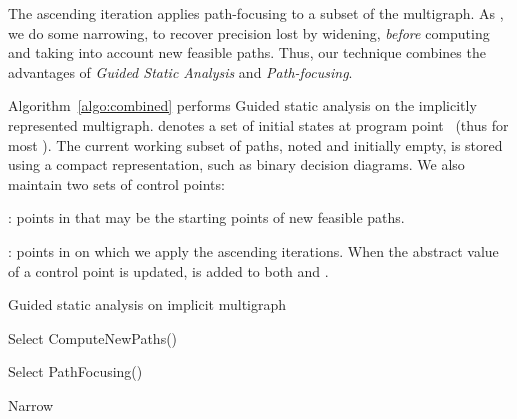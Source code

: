 The ascending iteration applies path-focusing
\cite{Monniaux_Gonnord_SAS11} to a subset of the multigraph. As
\cite{DBLP:conf/sas/GopanR07}, we do some narrowing, to recover
precision lost by widening, \emph{before}
computing and taking into account new feasible paths. Thus, our
technique combines the advantages of \emph{Guided Static
  Analysis} and \emph{Path-focusing}.




Algorithm~\ref{algo:combined} performs Guided static analysis on the implicitly represented multigraph.
 denotes a set of initial states at program point~ (thus  for most ).
The current working subset of paths, noted  and initially empty, is
stored using a compact representation, such as binary decision
diagrams. We also maintain two sets of control points:
\begin{compactitem}
	\item  : points in  that may be the starting points of new
		feasible paths.
	\item  : points in  on which we apply the ascending iterations.
	When the abstract value of a control point  is updated,  is
	added to both  and .
\end{compactitem}

\begin{algorithm}
	\caption{Guided static analysis on implicit multigraph}
	\label{algo:combined}
	\begin{algorithmic}[1] 
	\STATE 
\STATE 
\STATE  {}
\FORALL{}
	\STATE  \label{alg=X-init}
\ENDFOR 
\WHILE{}

\WHILE{} \label{alg=start-add-paths} 
	\STATE Select 
	\STATE 
	\STATE ComputeNewPaths() \label{alg=computeNewPaths}
\ENDWHILE \label{alg=end-add-paths}

\STATE {}
\WHILE{} \label{alg=start-ascending} 
	\STATE Select 
	\STATE 
	\STATE PathFocusing() 
	
\ENDWHILE \label{alg=end-ascending}
\STATE Narrow \label{alg=narrowing}
\ENDWHILE

\RETURN 

 	\end{algorithmic}
\end{algorithm}


